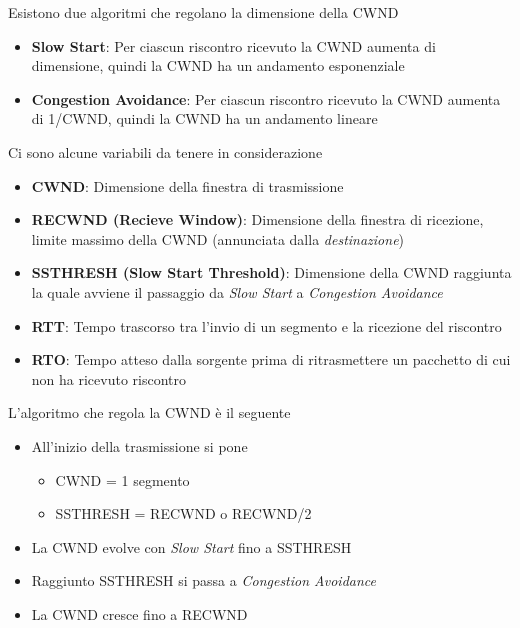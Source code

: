 \documentclass{article}
\newcounter{subsubsubsection}[subsubsection]
\begin{document}
                    Esistono due algoritmi che regolano la dimensione della CWND
                    \begin{itemize}
                        \item \textbf{Slow Start}: Per ciascun riscontro ricevuto la CWND aumenta di dimensione, quindi la CWND ha un andamento esponenziale
                        \item \textbf{Congestion Avoidance}: Per ciascun riscontro ricevuto la CWND aumenta di 1/CWND, quindi la CWND ha un andamento lineare
                    \end{itemize}
                    Ci sono alcune variabili da tenere in considerazione
                    \begin{itemize}
                        \item \textbf{CWND}: Dimensione della finestra di trasmissione
                        \item \textbf{RECWND (Recieve Window)}: Dimensione della finestra di ricezione, limite massimo della CWND (annunciata dalla \textit{destinazione})
                        \item \textbf{SSTHRESH (Slow Start Threshold)}: Dimensione della CWND raggiunta la quale avviene il passaggio da \textit{Slow Start} a \textit{Congestion Avoidance}
                        \item \textbf{RTT}: Tempo trascorso tra l'invio di un segmento e la ricezione del riscontro
                        \item \textbf{RTO}: Tempo atteso dalla sorgente prima di ritrasmettere un pacchetto di cui non ha ricevuto riscontro 
                    \end{itemize}
                    L'algoritmo che regola la CWND è il seguente
                    \begin{itemize}
                        \item All'inizio della trasmissione si pone
                              \begin{itemize}
                                  \item CWND = 1 segmento
                                  \item SSTHRESH = RECWND o RECWND/2
                              \end{itemize}
                        \item La CWND evolve con \textit{Slow Start} fino a SSTHRESH
                        \item Raggiunto SSTHRESH si passa a \textit{Congestion Avoidance}
                        \item La CWND cresce fino a RECWND
                    \end{itemize}
\end{document}
